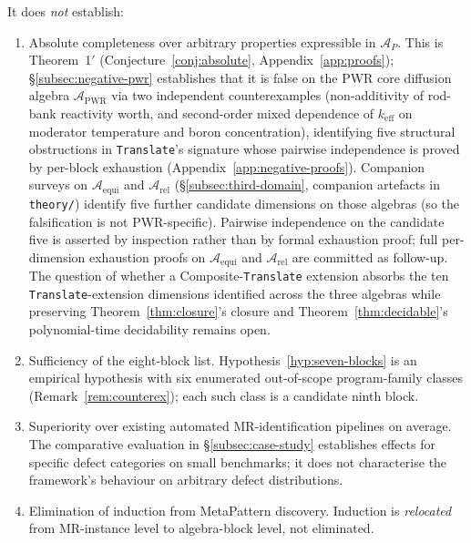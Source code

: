 \documentclass[acmsmall, screen]{acmart}
\begin{document}
\begin{tcolorbox}[colback=gray!5,colframe=black!50,arc=2pt,boxrule=0.5pt,fontupper=\small,title=Boundary of contribution,fonttitle=\small\bfseries]
It does \emph{not} establish:
\begin{enumerate}[leftmargin=*,nosep]
  \item[(a)] Absolute completeness over arbitrary properties expressible in $\mathcal{A}_P$. This is Theorem~1$'$ (Conjecture~\ref{conj:absolute}, Appendix~\ref{app:proofs}); \S\ref{subsec:negative-pwr} establishes that it is false on the PWR core diffusion algebra $\mathcal{A}_{\mathrm{PWR}}$ via two independent counterexamples (non-additivity of rod-bank reactivity worth, and second-order mixed dependence of $k_{\mathrm{eff}}$ on moderator temperature and boron concentration), identifying five structural obstructions in \texttt{Translate}'s signature whose pairwise independence is proved by per-block exhaustion (Appendix~\ref{app:negative-proofs}). Companion surveys on $\mathcal{A}_{\mathrm{equi}}$ and $\mathcal{A}_{\mathrm{rel}}$ (\S\ref{subsec:third-domain}, companion artefacts in \texttt{theory/}) identify five further candidate dimensions on those algebras (so the falsification is not PWR-specific). Pairwise independence on the candidate five is asserted by inspection rather than by formal exhaustion proof; full per-dimension exhaustion proofs on $\mathcal{A}_{\mathrm{equi}}$ and $\mathcal{A}_{\mathrm{rel}}$ are committed as follow-up. The question of whether a Composite-\texttt{Translate} extension absorbs the ten \texttt{Translate}-extension dimensions identified across the three algebras while preserving Theorem~\ref{thm:closure}'s closure and Theorem~\ref{thm:decidable}'s polynomial-time decidability remains open.
  \item[(b)] Sufficiency of the eight-block list. Hypothesis~\ref{hyp:seven-blocks} is an empirical hypothesis with six enumerated out-of-scope program-family classes (Remark~\ref{rem:counterex}); each such class is a candidate ninth block.
  \item[(c)] Superiority over existing automated MR-identification pipelines on average. The comparative evaluation in \S\ref{subsec:case-study} establishes effects for specific defect categories on small benchmarks; it does not characterise the framework's behaviour on arbitrary defect distributions.
  \item[(d)] Elimination of induction from MetaPattern discovery. Induction is \emph{relocated} from MR-instance level to algebra-block level, not eliminated.
\end{enumerate}
\end{tcolorbox}
\end{document}
